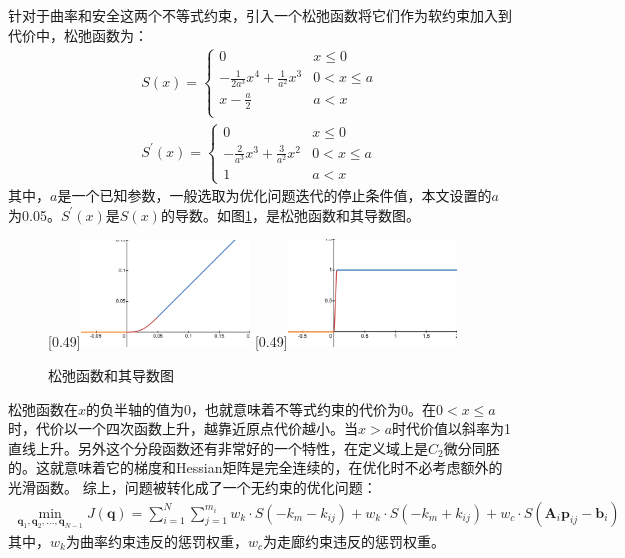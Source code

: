 \documentclass[master,academic]{ysuthesis} %
\begin{document}
		针对于曲率和安全这两个不等式约束，引入一个松弛函数将它们作为软约束加入到代价中，松弛函数为：
		\begin{equation}
			\begin{aligned}
				S( x ) =\left\{ \begin{matrix}
					0&		x\le 0\\
					-\frac{1}{2a^3}x^4+\frac{1}{a^2}x^3&		0<x\le a\\
					x-\frac{a}{2}&		a<x\\
				\end{matrix} \right.  \\
					S^{'}(x) = \left\{\begin{matrix}
					0& x\le0 \\
					-\frac{2}{a^3}x^3+\frac{3}{a^2}x^2& 0 < x \le a \\
					1& a < x
				\end{matrix}\right.
			\end{aligned}
			\label{eq:松弛函数}
		\end{equation}
		其中，$a$是一个已知参数，一般选取为优化问题迭代的停止条件值，本文设置的$a$为0.05。$S^{'}(x)$是$S(x)$的导数。如图\ref{fig:松弛函数图}，是松弛函数和其导数图。
		\begin{figure}[H]
			\centering
			[0.49\textwidth]{\includegraphics[width=0.4\textwidth]{松弛函数.png}}
			[0.49\textwidth]{\includegraphics[width=0.4\textwidth]{松弛导数.png}}
			\caption{松弛函数和其导数图}
			\label{fig:松弛函数图}
		\end{figure}

		松弛函数在$x$的负半轴的值为0，也就意味着不等式约束的代价为0。在$0<x \le a$时，代价以一个四次函数上升，越靠近原点代价越小。当$x>a$时代价值以斜率为1直线上升。另外这个分段函数还有非常好的一个特性，在定义域上是$C_2$微分同胚的。这就意味着它的梯度和Hessian矩阵是完全连续的，在优化时不必考虑额外的光滑函数。
		综上，问题被转化成了一个无约束的优化问题：
		\begin{equation}
			\begin{aligned}
				\min_{\bm{q}_1,\bm{q}_2,...,\bm{q}_{N-1}}  J( \bm{q} ) = \sum_{i=1}^N{\sum_{j=1}^{m_i}w_k\cdot{S( -k_m-k_{ij} ) +w_k\cdot S( -k_m+k_{ij} ) +w_c\cdot S( \bm{A}_i\bm{p}_{ij}-\bm{b}_{i})}}
			\end{aligned}
			\label{eq:单阶无约束优化代价}
		\end{equation}
		其中，$w_k$为曲率约束违反的惩罚权重，$w_c$为走廊约束违反的惩罚权重。
\end{document}
